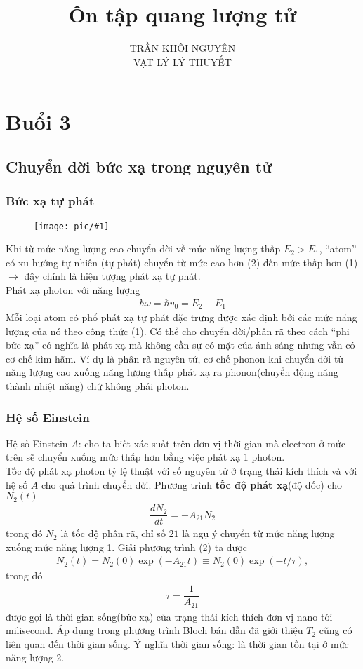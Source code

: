\documentclass{report}
\title{\Huge{Ôn tập quang lượng tử}}
\newcommand{\image}[1]{
\begin{figure}[H]
	\centering
	\texttt{[image: pic/\#1]}
	\label{#1}
\end{figure}
}
\newcommand{\q}[1]{``#1''
}
\newcommand{\f}[2]{\dfrac{#1}{#2}}
\begin{document}
\setlength{\parindent}{20pt}
\newpage
\author{TRẦN KHÔI NGUYÊN \\ VẬT LÝ LÝ THUYẾT}
\maketitle
\tableofcontents
\setcounter{chapter}{3}
\chapter{Buổi 3}
\section{Chuyển dời bức xạ trong nguyên tử}	
\subsection{Bức xạ tự phát}
\image{bucxatuphat.png}
Khi từ mức năng lượng cao chuyển dời về mức năng lượng thấp $E_{2} > E_{1}$, \q{atom} có xu hướng tự nhiên (tự phát) chuyển từ mức cao hơn (2) đến mức thấp hơn (1) $\rightarrow$ đây chính là hiện tượng phát xạ tự phát.\\
Phát xạ photon với năng lượng 
\begin{gather}
	\hbar \omega = \hbar v_{0} = E_{2} - E_{1}
\end{gather}
Mỗi loại atom có phổ phát xạ tự phát đặc trưng được xác định bởi các mức năng lượng của nó theo công thức (1).
Có thể cho chuyển dời/phân rã theo cách \q{phi bức xạ} có nghĩa là phát xạ mà không cần sự có mặt của ánh sáng nhưng vẫn có cơ chế kìm hãm. Ví dụ là phân rã nguyên tử, cơ chế phonon khi chuyển dời từ năng lượng cao xuống năng lượng thấp phát xạ ra phonon(chuyển động năng thành nhiệt năng) chứ không phải photon.
\subsection{Hệ số Einstein}
Hệ số Einstein $A$: cho ta biết xác suất trên đơn vị thời gian mà electron ở mức trên sẽ chuyển xuống mức thấp hơn bằng việc phát xạ 1 photon.\\
Tốc độ phát xạ photon tỷ lệ thuật với số nguyên tử ở trạng thái kích thích và với hệ số $A$ cho quá trình chuyển dời. Phương trình \textbf{tốc độ phát xạ}(độ dốc) cho $N_{2}(t)$
\begin{gather}
	\f{dN_{2}}{dt} = -A_{21} N_{2}
\end{gather}
trong đó $N_{2}$ là tốc độ phân rã, chỉ số $21$ là ngụ ý chuyển từ mức năng lượng xuống mức năng lượng 1. Giải phương trình (2) ta được
\begin{gather}
	N_{2}(t) = N_{2}(0) \exp(-A_{21}t) \equiv N_{2}(0) \exp(-t/\tau),
\end{gather}
trong đó
\begin{gather}
	\tau = \f{1}{A_{21}}
\end{gather}
được gọi là thời gian sống(bức xạ) của trạng thái kích thích đơn vị nano tới milisecond. Áp dụng trong phương trình Bloch bán dẫn đã giới thiệu $T_{2}$ cũng có liên quan đến thời gian sống. Ý nghĩa thời gian sống: là thời gian tồn tại ở mức năng lượng	2.
\end{document}

